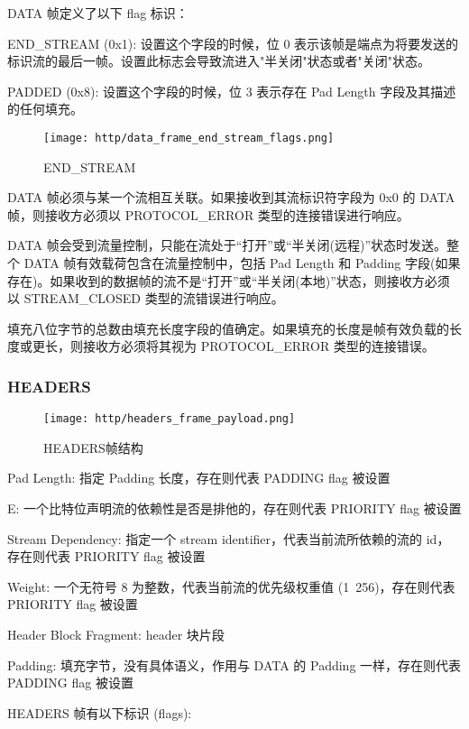 DATA 帧定义了以下 flag 标识：

END\_STREAM (0x1):
设置这个字段的时候，位 0 表示该帧是端点为将要发送的标识流的最后一帧。设置此标志会导致流进入"半关闭"状态或者"关闭"状态。

PADDED (0x8):
设置这个字段的时候，位 3 表示存在 Pad Length 字段及其描述的任何填充。


\begin{figure}[H]
    \centering
    \texttt{[image: http/data\_frame\_end\_stream\_flags.png]}
    \caption{END\_STREAM}
\end{figure}



DATA 帧必须与某一个流相互关联。如果接收到其流标识符字段为 0x0 的 DATA 帧，则接收方必须以 PROTOCOL\_ERROR 类型的连接错误进行响应。

DATA 帧会受到流量控制，只能在流处于“打开”或“半关闭(远程)”状态时发送。整个 DATA 帧有效载荷包含在流量控制中，包括 Pad Length 和 Padding 字段(如果存在)。如果收到的数据帧的流不是“打开”或“半关闭(本地)”状态，则接收方必须以 STREAM\_CLOSED 类型的流错误进行响应。

填充八位字节的总数由填充长度字段的值确定。如果填充的长度是帧有效负载的长度或更长，则接收方必须将其视为 PROTOCOL\_ERROR 类型的连接错误。


\subsubsection{HEADERS}

\begin{figure}[H]
    \centering
    \texttt{[image: http/headers\_frame\_payload.png]}
    \caption{HEADERS帧结构}
\end{figure}


Pad Length: 指定 Padding 长度，存在则代表 PADDING flag 被设置

E: 一个比特位声明流的依赖性是否是排他的，存在则代表 PRIORITY flag 被设置

Stream Dependency: 指定一个 stream identifier，代表当前流所依赖的流的 id，存在则代表 PRIORITY flag 被设置

Weight: 一个无符号 8 为整数，代表当前流的优先级权重值 (1~256)，存在则代表 PRIORITY flag 被设置

Header Block Fragment: header 块片段

Padding: 填充字节，没有具体语义，作用与 DATA 的 Padding 一样，存在则代表 PADDING flag 被设置

HEADERS 帧有以下标识 (flags):

